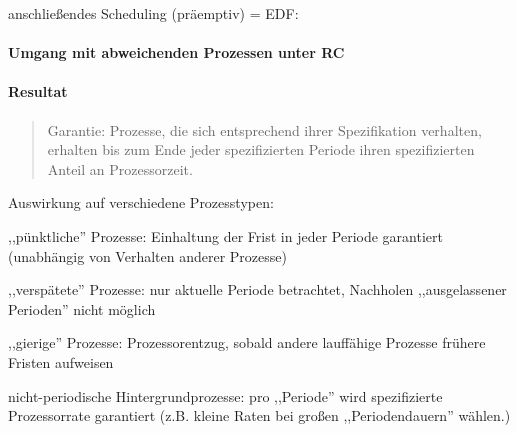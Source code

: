 \documentclass[a4paper]{article}
\begin{document}
\begin{multicols}{3}
    anschließendes Scheduling (präemptiv) = EDF:



    \paragraph{Umgang mit abweichenden Prozessen unter
        RC}



    \paragraph{Resultat}

    \begin{quote}
        Garantie: Prozesse, die sich entsprechend ihrer Spezifikation verhalten,
        erhalten bis zum Ende jeder spezifizierten Periode ihren spezifizierten
        Anteil an Prozessorzeit.
    \end{quote}

    Auswirkung auf verschiedene Prozesstypen:

    \begin{itemize*}
        \item ,,pünktliche'' Prozesse: Einhaltung der Frist in jeder Periode
        garantiert (unabhängig von Verhalten anderer Prozesse)
        \item ,,verspätete'' Prozesse: nur aktuelle Periode betrachtet, Nachholen
        ,,ausgelassener Perioden'' nicht möglich
        \item ,,gierige'' Prozesse: Prozessorentzug, sobald andere lauffähige
        Prozesse frühere Fristen aufweisen
        \item nicht-periodische Hintergrundprozesse: pro ,,Periode'' wird
        spezifizierte Prozessorrate garantiert (z.B. kleine Raten bei großen
        ,,Periodendauern'' wählen.)
    \end{itemize*}



\end{multicols}
\end{document}
